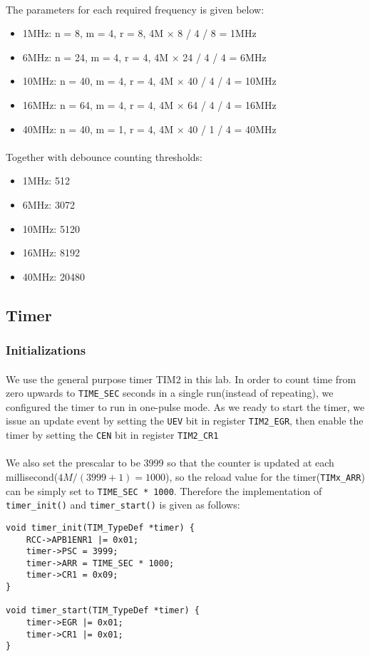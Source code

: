 \paragraph{}
The parameters for each required frequency is given below:
\begin{itemize}
    \item  1MHz: n =  8, m = 4, r = 8, 4M $\times$  8 / 4 / 8 =  1MHz
    \item  6MHz: n = 24, m = 4, r = 4, 4M $\times$ 24 / 4 / 4 =  6MHz
    \item 10MHz: n = 40, m = 4, r = 4, 4M $\times$ 40 / 4 / 4 = 10MHz
    \item 16MHz: n = 64, m = 4, r = 4, 4M $\times$ 64 / 4 / 4 = 16MHz
    \item 40MHz: n = 40, m = 1, r = 4, 4M $\times$ 40 / 1 / 4 = 40MHz
\end{itemize}
\paragraph{}
Together with debounce counting thresholds:
\begin{itemize}
    \item  1MHz: 512
    \item  6MHz: 3072
    \item 10MHz: 5120
    \item 16MHz: 8192
    \item 40MHz: 20480
\end{itemize}

\subsection{Timer}
\subsubsection{Initializations}
\paragraph{}
We use the general purpose timer TIM2 in this lab. 
In order to count time from zero upwards to \texttt{TIME\_SEC} seconds in a single run(instead of repeating),
we configured the timer to run in one-pulse mode.
As we ready to start the timer, we issue an update event by setting the \texttt{UEV} bit in register \texttt{TIM2\_EGR},
then enable the timer by setting the \texttt{CEN} bit in register \texttt{TIM2\_CR1}
\paragraph{}
We also set the prescalar to be 3999 so that the counter is updated at each millisecond($4M/(3999+1) = 1000$),
so the reload value for the timer(\texttt{TIMx\_ARR}) can be simply set to \texttt{TIME\_SEC * 1000}.
Therefore the implementation of \texttt{timer\_init()} and \texttt{timer\_start()} is given as follows:
\begin{lstlisting}
void timer_init(TIM_TypeDef *timer) {
	RCC->APB1ENR1 |= 0x01;
	timer->PSC = 3999;
	timer->ARR = TIME_SEC * 1000;
	timer->CR1 = 0x09;
}

void timer_start(TIM_TypeDef *timer) {
	timer->EGR |= 0x01;
	timer->CR1 |= 0x01;
}
\end{lstlisting}
